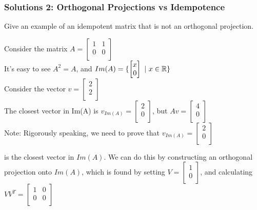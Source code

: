 \documentclass{beamer}
\newcommand\fonteight{\fontsize{8}{9.6}\selectfont}
\renewenvironment{enumerate}%
{\begin{list}{\arabic{enumi}.}%
      {\setlength{\leftmargin}{2.5em}%
       \setlength{\itemsep}{-\parsep}%
       \setlength{\topsep}{-\parskip}%
       \usecounter{enumi}}%
 }{\end{list}}
\begin{document}
\begin{frame}
\frametitle{Solutions 2: Orthogonal Projections vs Idempotence}
\begin{solution}
\begin{enumerate}
\item[3.] Give an example of an idempotent matrix that is not an orthogonal projection.  \\
\fonteight

Consider the matrix 
$A = \begin{bmatrix}
			1   & 1   \\
			0   & 0\\
		 \end{bmatrix}$\\
It's easy to see $A^2 = A$, and
$Im(A) = \{\begin{bmatrix}
x  \\
0  \\
\end{bmatrix}\ | \ x\in \mathbb{R}\}$\\
Consider the vector $v = \begin{bmatrix}
			2\\
			2\\
		 \end{bmatrix}$\\
The closest vector in Im(A) is $v_{Im(A)} = \begin{bmatrix}
			2\\
			0\\
		 \end{bmatrix}$, but $Av=\begin{bmatrix}
			4\\
			0\\
		 \end{bmatrix}$\\
\medskip
Note: Rigorously speaking, we need to prove that $v_{Im(A)} = \begin{bmatrix}
			2\\
			0\\
		 \end{bmatrix}$

is the closest vector in $Im(A)$. We can do this by constructing an orthogonal projection onto $Im(A)$,
which is found by setting $V =\begin{bmatrix}
			1\\
			0\\
\end{bmatrix}$, and calculating $VV^T = \begin{bmatrix}
			1   & 0   \\
			0   & 0\\
		 \end{bmatrix}$\\
\end{enumerate}
\end{solution}
\end{frame}
\end{document}
